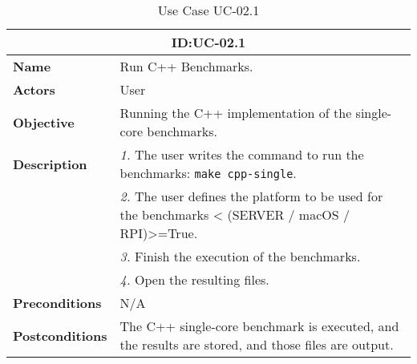 \begin{table}[H]
    \centering
    \begin{tabular}{l p{10cm}}
        \toprule
        \multicolumn{2}{c}{\textbf{ID:\@ UC-02.1}} \\
        \toprule
        \textbf{Name}                         &  Run C++ Benchmarks. \\
        \textbf{Actors}                       &  User \\
        \textbf{Objective}                    &  Running the C++ implementation of the single-core benchmarks. \\
        \multirow{1}{*}{\textbf{Description}} & \textsl{1.} The user writes the command to run the benchmarks: \texttt{make cpp-single}.\\
                                              & \textsl{2.} The user defines the platform to be used for the benchmarks < (SERVER / macOS / RPI)>=True.\\
                                              & \textsl{3.} Finish the execution of the benchmarks.\\
                                              & \textsl{4.} Open the resulting files.\\
        \textbf{Preconditions}                &  N/A \\
        \textbf{Postconditions}               &  The C++ single-core benchmark is executed, and the results are stored, and those files are output. \\
    \end{tabular}
    \caption{Use Case UC-02.1}\label{tab:uc-02.1}
\end{table}

